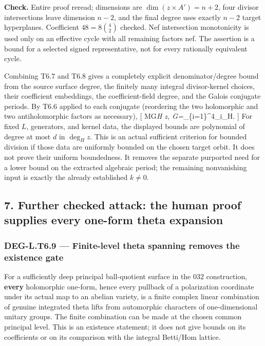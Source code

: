 \documentclass[11pt,a4paper]{article}
\theoremstyle{definition}
\begin{document}
\textbf{Check.} Entire proof reread; dimensions are
\(\dim(z\times A')=n+2\), four divisor intersections leave dimension
\(n-2\), and the final degree uses exactly \(n-2\) target hyperplanes.
Coefficient \(48=8\binom42\) checked. Nef intersection monotonicity is
used only on an effective cycle with all remaining factors nef. The
assertion is a bound for a selected signed representative, not for every
rationally equivalent cycle.

Combining T6.7 and T6.8 gives a completely explicit denominator/degree
bound from the source surface degree, the finitely many integral
divisor-kernel choices, their coefficient embeddings, the
coefficient-field degree, and the Galois conjugate periods. By T6.6
applied to each conjugate (reordering the two holomorphic and two
antiholomorphic factors as necessary), {[} M\le G\deg\emph{H z,\qquad
G=\max}\sigma\prod\_\{i=1\}\^{}4\textbar{}\sigma\alpha\_i\textbar\_H.
{]} For fixed \(L\), generators, and kernel data, the displayed bounds
are polynomial of degree at most \(d\) in \(\deg_H z\). This is an
actual sufficient criterion for bounded division if those data are
uniformly bounded on the chosen target orbit. It does not prove their
uniform boundedness. It removes the separate purported need for a lower
bound on the extracted algebraic period; the remaining nonvanishing
input is exactly the already established \(k\ne0\).

\subsection{7. Further checked attack: the human proof supplies every
one-form theta
expansion}\label{further-checked-attack-the-human-proof-supplies-every-one-form-theta-expansion}

\subsubsection{DEG-L.T6.9 --- Finite-level theta spanning removes the
existence
gate}\label{deg-l.t6.9-finite-level-theta-spanning-removes-the-existence-gate}

For a sufficiently deep principal ball-quotient surface in the 032
construction, \textbf{every} holomorphic one-form, hence every pullback
of a polarization coordinate under its actual map to an abelian variety,
is a finite complex linear combination of genuine integrated theta lifts
from automorphic characters of one-dimensional unitary groups. The
finite combination can be made at the chosen common principal level.
This is an existence statement; it does not give bounds on its
coefficients or on its comparison with the integral Betti/Hom lattice.
\end{document}
